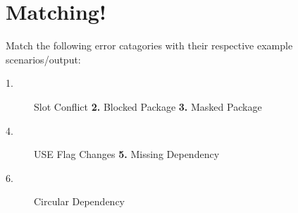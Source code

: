 \documentclass[11pt]{article}
\begin{document}
 \section*{Matching!}
 
  Match the following error catagories with their respective example scenarios/output:  
  \begin{description}
    \item[1.] Slot Conflict \underline{\hspace{1.5cm}} \hspace{2mm} \textbf{2.} Blocked Package \underline{\hspace{1.5cm}} \hspace{2mm} \textbf{3.} Masked Package \underline{\hspace{1.5cm}}
    \item[4.] USE Flag Changes \underline{\hspace{1.5cm}} \hspace{2mm} \textbf{5.} Missing Dependency \underline{\hspace{1.5cm}}
    \item[6.] Circular Dependency \underline{\hspace{1.5cm}}
   \end{description}
\end{document}
